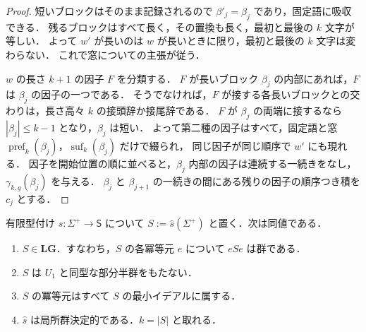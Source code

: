 \begin{proof}
短いブロックはそのまま記録されるので $\beta'_j=\beta_j$ であり，固定語に吸収できる．
残るブロックはすべて長く，その置換も長く，最初と最後の $k$ 文字が等しい．
よって $w'$ が長いのは $w$ が長いときに限り，最初と最後の $k$ 文字は変わらない．
これで窓についての主張が従う．

$w$ の長さ $k+1$ の因子 $F$ を分類する．
$F$ が長いブロック $\beta_j$ の内部にあれば，$F$ は $\beta_j$ の因子の一つである．
そうでなければ，$F$ が接する各長いブロックとの交わりは，長さ高々 $k$ の接頭辞か接尾辞である．
$F$ が $\beta_j$ の両端に接するなら $|\beta_j|\le k-1$ となり，$\beta_j$ は短い．
よって第二種の因子はすべて，固定語と窓
$\operatorname{pref}_k(\beta_j)$，$\operatorname{suf}_k(\beta_j)$ だけで綴られ，
同じ因子が同じ順序で $w'$ にも現れる．
因子を開始位置の順に並べると，$\beta_j$ 内部の因子は連続する一続きをなし，
$\gamma_{k,g}(\beta_j)$ を与える．
$\beta_j$ と $\beta_{j+1}$ の一続きの間にある残りの因子の順序つき積を $c_j$ とする．
\end{proof}

\begin{theorem}[局所群正像の特徴づけ]
\label{thm:lg-characterization}
有限型付け $s:\Sigma^+\to\mathsf S$ について $S:=\widehat{s}(\Sigma^+)$ と置く．次は同値である．
\begin{enumerate}[label=\textup{(\roman*)},leftmargin=*]
\item $S\in\mathbf{LG}$．すなわち，$S$ の各冪等元 $e$ について $eSe$ は群である．
\item $S$ は $U_1$ と同型な部分半群をもたない．
\item $S$ の冪等元はすべて $S$ の最小イデアルに属する．
\item $\widehat{s}$ は局所群決定的である．$k=|S|$ と取れる．
\end{enumerate}
\end{theorem}

